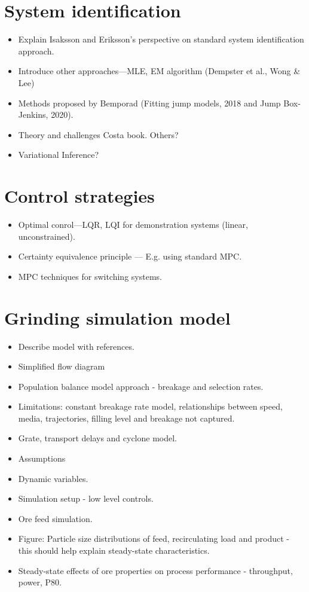 \section{System identification}

\begin{itemize}
	\item Explain Isaksson and Eriksson's perspective on standard system identification approach.
	\item Introduce other approaches—MLE, EM algorithm (Dempster et al., Wong \& Lee)
	\item Methods proposed by Bemporad (Fitting jump models, 2018 and Jump Box-Jenkins, 2020).
	\item Theory and challenges Costa book. Others?
	\item Variational Inference?
\end{itemize}


\section{Control strategies}

\begin{itemize}
	\item Optimal conrol—LQR, LQI for demonstration systems (linear, unconstrained).
	\item Certainty equivalence principle — E.g. using standard MPC.
	\item MPC techniques for switching systems.
\end{itemize}

\section{Grinding simulation model}

\begin{itemize}
	\item Describe model with references.
	\item Simplified flow diagram
	\item Population balance model approach - breakage and selection rates.
    \item Limitations: constant breakage rate model, relationships between speed, media, trajectories,  filling level and breakage not captured.
	\item Grate, transport delays and cyclone model.
	\item Assumptions
	\item Dynamic variables.
	\item Simulation setup - low level controls.
	\item Ore feed simulation.
	\item Figure: Particle size distributions of feed, recirculating load and product - this should help explain steady-state characteristics.
	\item Steady-state effects of ore properties on process performance - throughput, power, P80.
\end{itemize}

